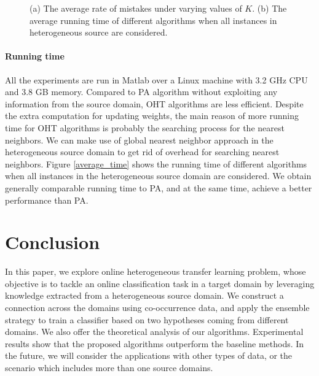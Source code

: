 \documentclass{article} %
\theoremstyle{remark}
\theoremstyle{definition}
\begin{document}
\begin{figure}[H]
\centering
  \caption{(a) The average rate of mistakes under varying values of $K$. (b) The average running time of different algorithms when all instances in heterogeneous source are considered.}
  \label{average eok}
\end{figure}

\paragraph{Running time}
All the experiments are run in Matlab over a Linux machine with 3.2 GHz CPU and 3.8 GB memory.
Compared to PA algorithm without exploiting any information from the source domain, OHT algorithms are less efficient.
Despite the extra computation for updating weights, the main reason of more running time for OHT algorithms is probably the searching process for the nearest neighbors.
We can make use of global nearest neighbor approach in the heterogeneous source domain to get rid of overhead for searching nearest neighbors.
Figure \ref{average_time} shows the running time of different algorithms when all instances in the heterogeneous source domain are considered.
We obtain generally comparable running time to PA, and at the same time, achieve a better performance than PA.

\section{Conclusion}

In this paper, we explore online heterogeneous transfer learning problem, whose objective is to tackle an online classification task in a target domain by leveraging knowledge extracted from a heterogeneous source domain.
We construct a connection across the domains using co-occurrence data, and apply the ensemble strategy to train a classifier based on two hypotheses coming from different domains.
We also offer the theoretical analysis of our algorithms.
Experimental results show that the proposed algorithms outperform the baseline methods.
In the future, we will consider the applications with other types of data, or the scenario which includes more than one source domains.



\end{document}
